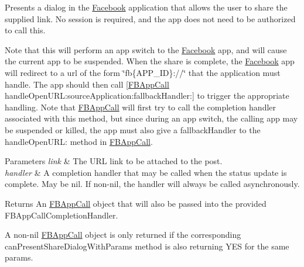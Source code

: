 Presents a dialog in the \hyperlink{interfaceFacebook}{Facebook} application that allows the user to share the supplied link. No session is required, and the app does not need to be authorized to call this.

Note that this will perform an app switch to the \hyperlink{interfaceFacebook}{Facebook} app, and will cause the current app to be suspended. When the share is complete, the \hyperlink{interfaceFacebook}{Facebook} app will redirect to a url of the form \char`\"{}fb\{\+A\+P\+P\+\_\+\+I\+D\}\+://\char`\"{} that the application must handle. The app should then call \mbox{[}\hyperlink{interfaceFBAppCall}{F\+B\+App\+Call} handle\+Open\+U\+R\+L\+:source\+Application\+:fallback\+Handler\+:\mbox{]} to trigger the appropriate handling. Note that \hyperlink{interfaceFBAppCall}{F\+B\+App\+Call} will first try to call the completion handler associated with this method, but since during an app switch, the calling app may be suspended or killed, the app must also give a fallback\+Handler to the handle\+Open\+U\+RL\+: method in \hyperlink{interfaceFBAppCall}{F\+B\+App\+Call}.


\begin{DoxyParams}{Parameters}
{\em link} & The U\+RL link to be attached to the post.\\
\hline
{\em handler} & A completion handler that may be called when the status update is complete. May be nil. If non-\/nil, the handler will always be called asynchronously.\\
\hline
\end{DoxyParams}
\begin{DoxyReturn}{Returns}
An \hyperlink{interfaceFBAppCall}{F\+B\+App\+Call} object that will also be passed into the provided F\+B\+App\+Call\+Completion\+Handler.
\end{DoxyReturn}
A non-\/nil \hyperlink{interfaceFBAppCall}{F\+B\+App\+Call} object is only returned if the corresponding can\+Present\+Share\+Dialog\+With\+Params method is also returning Y\+ES for the same params. \mbox{\label{interfaceFBDialogs_aaed28cb89925f451c2d8bab8f1b44e22}} 
